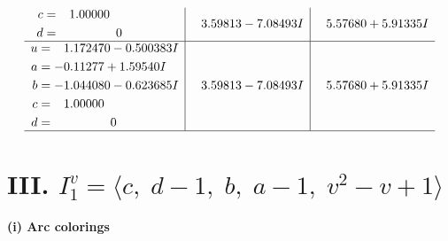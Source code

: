 \documentclass[1p]{elsarticle_modified}
\theoremstyle{definition}
\begin{document}
$$\begin{array}{c|c|c}
\begin{aligned}
c &= \phantom{-}1.00000\phantom{ +0.000000I} \\
d &= \phantom{-0.000000 } 0\end{aligned}
 & \phantom{-}3.59813 - 7.08493 I & \phantom{-}5.57680 + 5.91335 I \\ \hline\begin{aligned}
u &= \phantom{-}1.172470 - 0.500383 I \\
a &= -0.11277 + 1.59540 I \\
b &= -1.044080 - 0.623685 I \\
c &= \phantom{-}1.00000\phantom{ +0.000000I} \\
d &= \phantom{-0.000000 } 0\end{aligned}
 & \phantom{-}3.59813 - 7.08493 I & \phantom{-}5.57680 + 5.91335 I\\
 \hline 
 \end{array}$$\newpage\newpage\renewcommand{\arraystretch}{1}
\centering \section*{III. $I^v_{1}= \langle c,\;d-1,\;b,\;a-1,\;v^2- v+1 \rangle$}
\flushleft \textbf{(i) Arc colorings}\\
\end{document}

